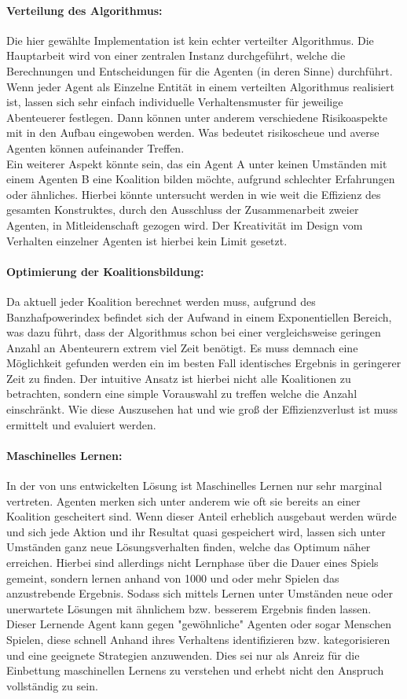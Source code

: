 \documentclass[fleqn,10pt]{SelfArx} %
\begin{document}
\paragraph{Verteilung des Algorithmus:}
Die hier gewählte Implementation ist kein echter verteilter Algorithmus. Die Hauptarbeit wird von einer zentralen Instanz durchgeführt, welche die Berechnungen und Entscheidungen für die Agenten (in deren Sinne) durchführt. Wenn jeder Agent als Einzelne Entität in einem verteilten Algorithmus realisiert ist, lassen sich sehr einfach individuelle Verhaltensmuster für jeweilige Abenteuerer festlegen. Dann können unter anderem verschiedene Risikoaspekte mit in den Aufbau eingewoben werden. Was bedeutet risikoscheue und averse Agenten können aufeinander Treffen. \\
Ein weiterer Aspekt könnte sein, das ein Agent A unter keinen Umständen mit einem Agenten B	eine Koalition bilden möchte, aufgrund schlechter Erfahrungen oder ähnliches. Hierbei könnte untersucht werden in wie weit die Effizienz des gesamten Konstruktes, durch den Ausschluss der Zusammenarbeit zweier Agenten, in Mitleidenschaft gezogen wird. Der Kreativität im Design vom Verhalten einzelner Agenten ist hierbei kein Limit gesetzt.

\paragraph{Optimierung der Koalitionsbildung:}
Da aktuell jeder Koalition berechnet werden muss, aufgrund des Banzhafpowerindex befindet sich der Aufwand in einem Exponentiellen Bereich, was dazu führt, dass der Algorithmus schon bei einer vergleichsweise geringen Anzahl an Abenteurern extrem viel Zeit benötigt. Es muss demnach eine Möglichkeit gefunden werden ein im besten Fall identisches Ergebnis in geringerer Zeit zu finden. Der intuitive Ansatz ist hierbei nicht alle Koalitionen zu betrachten, sondern eine simple Vorauswahl zu treffen welche die Anzahl einschränkt. Wie diese Auszusehen hat und wie groß der Effizienzverlust ist muss ermittelt und evaluiert werden.

\paragraph{Maschinelles Lernen:} 
In der von uns entwickelten Lösung ist Maschinelles Lernen nur sehr marginal vertreten. Agenten merken sich unter anderem wie oft sie bereits an einer Koalition gescheitert sind. Wenn dieser Anteil erheblich ausgebaut werden würde und sich jede Aktion und ihr Resultat quasi gespeichert wird, lassen sich unter Umständen ganz neue Lösungsverhalten finden, welche das Optimum näher erreichen. Hierbei sind allerdings nicht Lernphase über die Dauer eines Spiels gemeint, sondern lernen anhand von 1000 und oder mehr Spielen das anzustrebende Ergebnis. Sodass sich mittels Lernen unter Umständen neue oder unerwartete Lösungen mit ähnlichem bzw. besserem Ergebnis finden lassen. Dieser Lernende Agent kann gegen "gewöhnliche" Agenten oder sogar Menschen Spielen, diese schnell Anhand ihres Verhaltens identifizieren bzw. kategorisieren und eine geeignete Strategien anzuwenden. Dies sei nur als Anreiz für die Einbettung maschinellen Lernens zu verstehen und erhebt nicht den Anspruch vollständig zu sein.
\end{document}
